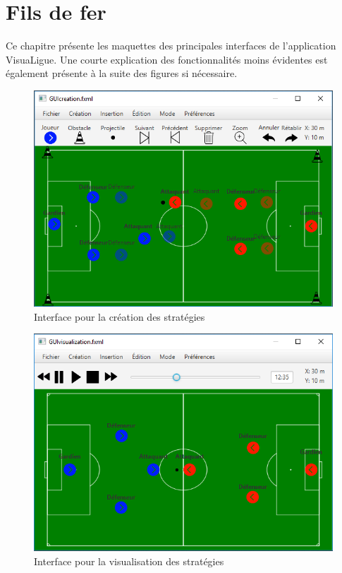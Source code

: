 
\chapter{Fils de fer}
\label{s:fil_fer}

Ce chapitre présente les maquettes des principales interfaces de l'application VisuaLigue.
Une courte explication des fonctionnalités moins évidentes est également présente à la suite des figures si nécessaire.

\begin{figure}[htpb]
    \centering
    \includegraphics[scale=0.7]{fig/gui/gui_creation.png}
    \caption{Interface pour la création des stratégies}
    \label{fig:gui:gui_creation}
\end{figure}

\begin{figure}[htpb]
    \centering
    \includegraphics[scale=0.7]{fig/gui/gui_visualisation.png}
    \caption{Interface pour la visualisation des stratégies}
    \label{fig:gui:gui_visualisation}
\end{figure}

